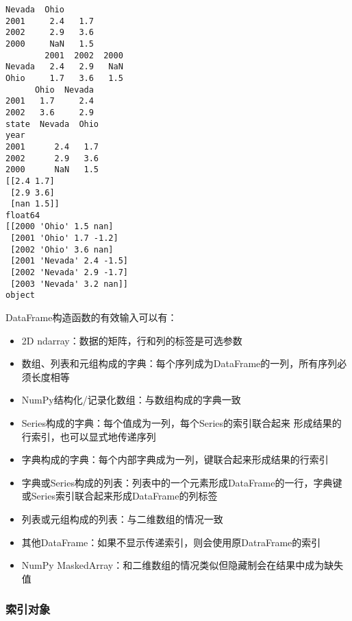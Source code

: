 \documentclass[11pt]{article}
\providecommand{\tightlist}{%
      \setlength{\itemsep}{0pt}\setlength{\parskip}{0pt}}
\begin{document}
    \begin{Verbatim}[commandchars=\\\{\}]
      Nevada  Ohio
2001     2.4   1.7
2002     2.9   3.6
2000     NaN   1.5
        2001  2002  2000
Nevada   2.4   2.9   NaN
Ohio     1.7   3.6   1.5
      Ohio  Nevada
2001   1.7     2.4
2002   3.6     2.9
state  Nevada  Ohio
year
2001      2.4   1.7
2002      2.9   3.6
2000      NaN   1.5
[[2.4 1.7]
 [2.9 3.6]
 [nan 1.5]]
float64
[[2000 'Ohio' 1.5 nan]
 [2001 'Ohio' 1.7 -1.2]
 [2002 'Ohio' 3.6 nan]
 [2001 'Nevada' 2.4 -1.5]
 [2002 'Nevada' 2.9 -1.7]
 [2003 'Nevada' 3.2 nan]]
object
    \end{Verbatim}

    DataFrame构造函数的有效输入可以有：

\begin{itemize}
\tightlist
\item
  2D ndarray：数据的矩阵，行和列的标签是可选参数
\item
  数组、列表和元组构成的字典：每个序列成为DataFrame的一列，所有序列必须长度相等
\item
  NumPy结构化/记录化数组：与数组构成的字典一致
\item
  Series构成的字典：每个值成为一列，每个Series的索引联合起来
  形成结果的行索引，也可以显式地传递序列
\item
  字典构成的字典：每个内部字典成为一列，键联合起来形成结果的行索引
\item
  字典或Series构成的列表：列表中的一个元素形成DataFrame的一行，字典键或Series索引联合起来形成DataFrame的列标签
\item
  列表或元组构成的列表：与二维数组的情况一致
\item
  其他DataFrame：如果不显示传递索引，则会使用原DatraFrame的索引
\item
  NumPy MaskedArray：和二维数组的情况类似但隐藏制会在结果中成为缺失值
\end{itemize}

    \hypertarget{ux7d22ux5f15ux5bf9ux8c61}{%
\subsubsection{索引对象}\label{ux7d22ux5f15ux5bf9ux8c61}}
\end{document}
